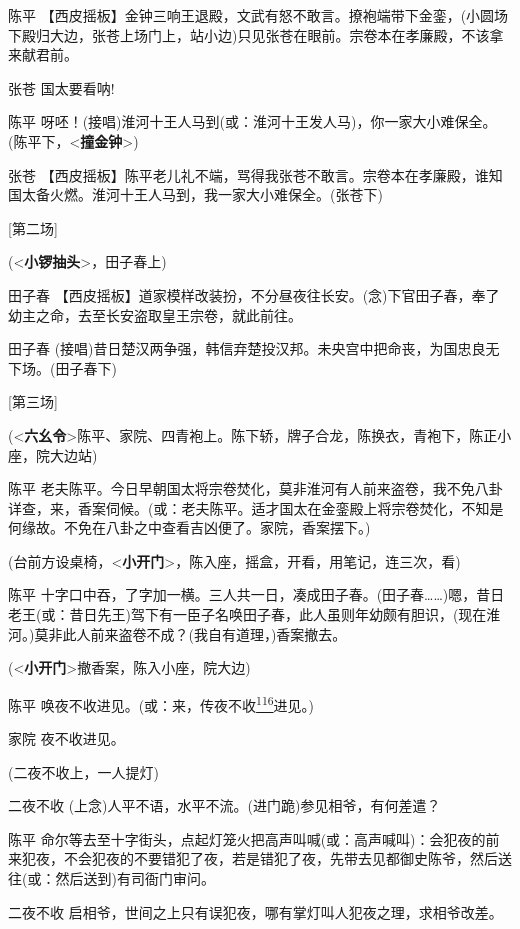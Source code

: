 陈平
【西皮摇板】金钟三响王退殿，文武有怒不敢言。撩袍端带下金銮，(小圆场下殿归大边，张苍上场门上，站小边)只见张苍在眼前。宗卷本在孝廉殿，不该拿来献君前。

张苍 国太要看呐!

陈平
呀呸！(接唱)淮河十王人马到(或：淮河十王发人马)，你一家大小难保全。(陈平下，\textless{}\textbf{撞金钟}\textgreater{})

张苍
【西皮摇板】陈平老儿礼不端，骂得我张苍不敢言。宗卷本在孝廉殿，谁知国太备火燃。淮河十王人马到，我一家大小难保全。(张苍下)

{[}第二场{]}

(\textless{}\textbf{小锣抽头}\textgreater{}，田子春上)

田子春
【西皮摇板】道家模样改装扮，不分昼夜往长安。(念)下官田子春，奉了幼主之命，去至长安盗取皇王宗卷，就此前往。

田子春
(接唱)昔日楚汉两争强，韩信弃楚投汉邦。未央宫中把命丧，为国忠良无下场。(田子春下)

{[}第三场{]}

(\textless{}\textbf{六幺令}\textgreater{}陈平、家院、四青袍上。陈下轿，牌子合龙，陈换衣，青袍下，陈正小座，院大边站)

陈平
老夫陈平。今日早朝国太将宗卷焚化，莫非淮河有人前来盗卷，我不免八卦详查，来，香案伺候。(或：老夫陈平。适才国太在金銮殿上将宗卷焚化，不知是何缘故。不免在八卦之中查看吉凶便了。家院，香案摆下。)

(台前方设桌椅，\textless{}\textbf{小开门}\textgreater{}，陈入座，摇盒，开看，用笔记，连三次，看)

陈平
十字口中吞，了字加一横。三人共一日，凑成田子春。(田子春\ldots{}\ldots{})嗯，昔日老王(或：昔日先王)驾下有一臣子名唤田子春，此人虽则年幼颇有胆识，(现在淮河。)莫非此人前来盗卷不成？(我自有道理，)香案撤去。

(\textless{}\textbf{小开门}\textgreater{}撤香案，陈入小座，院大边)

陈平
唤夜不收进见。(或：来，传夜不收\protect\hyperlink{fn116}{\textsuperscript{116}}进见。)

家院 夜不收进见。

(二夜不收上，一人提灯)

二夜不收 (上念)人平不语，水平不流。(进门跪)参见相爷，有何差遣？

陈平
命尔等去至十字街头，点起灯笼火把高声叫喊(或：高声喊叫)：会犯夜的前来犯夜，不会犯夜的不要错犯了夜，若是错犯了夜，先带去见都御史陈爷，然后送往(或：然后送到)有司衙门审问。

二夜不收 启相爷，世间之上只有误犯夜，哪有掌灯叫人犯夜之理，求相爷改差。

